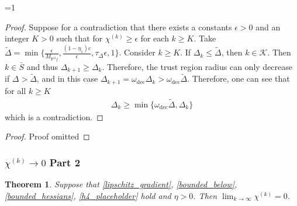 \documentclass{article}
\newtheorem{theorem}{Theorem}[section]
\theoremstyle{case}
\newcommand{\dk}{\Delta_k}
\newcommand{\chik}{{\chi^{(k)}}}
\newcommand{\omegadec}{\omega_{\text{dec}}}
\newcommand{\oalpha}{\tau_{\Delta}}
\newcommand{\dkpo}{\Delta_{k+1}}
\newcommand{\hfb}{{M_{\nabla^2 f}}}
\def\includeproofs{1}
\begin{document}
\ifnum\includeproofs=1
\begin{proof}
Suppose for a contradiction that there exists a constants $\epsilon > 0$ and an integer $K > 0$ such that for $\chik \ge \epsilon$ for each $k \ge K$.
Take $ \tilde \Delta = \min \{\frac{\epsilon}{\hfb}, \frac{(1 - \eta_1)c}{\epsilon}, \oalpha \epsilon, 1\}$.
Consider $k \ge K$.
If $\dk \le \tilde \Delta$, then $k \in \mathcal K$.
Then $k \in \bar S$ and thus $\dkpo \ge \dk$.
Therefore, the trust region radius can only decrease if $\Delta > \tilde \Delta$, and in this case $\dkpo = \omegadec\dk > \omegadec \tilde \Delta$.
Therefore, one can see that for all $k \ge K$
\begin{align}
\dk \ge \min\{\omegadec \tilde \Delta, \dk \}
\end{align}
which is a contradiction.
\end{proof}
\else
\begin{proof}
Proof omitted
\end{proof}
\fi



\subsubsection{$\chik \to 0$ Part 2}
\begin{theorem}
Suppose that \cref{lipschitz_gradient}, \cref{bounded_below}, \cref{bounded_hessians}, \cref{h4_placeholder} hold and $\eta > 0$. Then $\lim_{k\to\infty}\chik=0$.
\end{theorem}
\end{document}
